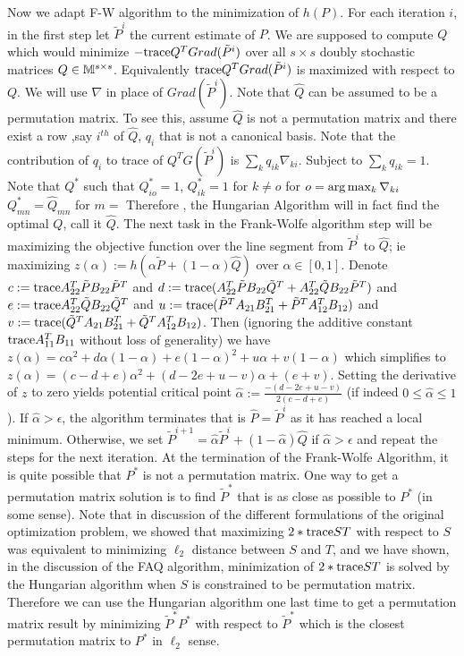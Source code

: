 \documentclass[12pt,oneside,final]{thesis}\usepackage[]{graphicx}\usepackage[]{color}
\begin{document}
Now we adapt F-W algorithm to the minimization of $h(P)$.  For each iteration $i$, in the first step let $\tilde{P}^{i}$ the current estimate of $P$. We are supposed to compute  $Q$ which would minimize  $-\textup{trace} Q^{T}Grad(\tilde{P}^{i})$ over all $s \times s$ doubly stochastic matrices $Q \in \mathbb{M} ^{s \times s}$. Equivalently $\textup{trace} Q^{T}Grad(\tilde{P}^{i})$ is maximized with respect to $Q$. We will use  $\nabla$ in place of $Grad(\tilde{P}^{i})$.
Note that $\hat{Q}$ can be assumed to be a permutation matrix.  To see this, assume $\hat{Q}$ is not a permutation matrix and there exist a row ,say $i^{th}$ of $\hat{Q}$, $q_i$ that is not a canonical basis. Note that the contribution of $q_{i}$ to trace of $Q^{T}G(\tilde{P}^{i})$ is $\sum_{k}{q_{ik}\nabla{}_{ki}}$. Subject to $\sum_{k}{q_{ik}}=1$. Note that $Q^{*}$ such that $Q_{io}^{*}=1$,  $Q_{ik}^{*}=1$ for $k \neq o$ for $o=\arg\max_k{\nabla{}_{ki}}$  $Q_{mn}^{*}=\hat{Q}_{mn}$ for $m=$
Therefore , the  Hungarian Algorithm will in fact find the optimal $Q$, call it
$\hat{Q}$.
The next task in the Frank-Wolfe algorithm step
will be maximizing the objective function over the line
segment from $\tilde{P}^{i}$ to $\hat{Q}$;  ie maximizing $z(\alpha):=h(\alpha \tilde{P}
+(1-\alpha ) \hat{Q})$ over $\alpha \in [0,1]$. Denote
$c:=\textup{trace} A^T_{22} \tilde{P} B_{22} \tilde{P}^T$ and
$d:=\textup{trace} (A^T_{22} \tilde{P} B_{22} \tilde{Q}^T +
    A^T_{22} \tilde{Q} B_{22} \tilde{P}^T)$ and
$e:=\textup{trace} A^T_{22} \tilde{Q} B_{22} \tilde{Q}^T$ and
$u:=\textup{trace} ( \tilde{P}^TA_{21}B_{21}^T   + \tilde{P}^TA_{12}^TB_{12} )$ and
$v:=\textup{trace} ( \tilde{Q}^TA_{21}B_{21}^T   + \tilde{Q}^TA_{12}^TB_{12} )$. Then
(ignoring the additive constant $\textup{trace} A_{11}^TB_{11}$ without loss of
generality)
we have $z(\alpha)=c \alpha^2+d \alpha (1-\alpha)
+e(1-\alpha)^2+u \alpha + v(1-\alpha)$  which simplifies to
$z(\alpha)=(c-d+e)\alpha^2+(d-2e+u-v)\alpha + (e+v)$. Setting the
derivative of $z$ to zero yields potential critical point
$\hat{\alpha}:=\frac{-(d-2e+u-v)}{2(c-d+e)}$ (if indeed
$0 \leq \hat{\alpha}\leq 1$). 
If $\hat{\alpha}>\epsilon$, the algorithm terminates that is $\hat{P}=\tilde{P}^{i}$ as it has reached a local minimum. Otherwise, we set $\tilde{P}^{i+1}= \hat{\alpha} \tilde{P}^{i}
+(1- \hat{\alpha} ) \hat{Q}$ if $\hat{\alpha}>\epsilon$   and repeat the steps for the next iteration.
At the termination of the Frank-Wolfe Algorithm, it is quite possible that   ${P}^{*}$ is not a permutation matrix. One way to get a permutation matrix solution is to find  ${\tilde{P}}^{*}$ that is as close as possible to  ${P}^{*}$ (in some sense).  Note that in discussion of the different formulations of the  original optimization problem, we showed that maximizing $2*\textup{trace} {ST}$ with respect to $S$ was equivalent to minimizing $\ell_2$ distance between $S$ and $T$, and we have shown, in the discussion of the FAQ algorithm, minimization of  $2*\textup{trace} {ST}$ is solved by the Hungarian algorithm when $S$ is constrained to be permutation matrix. Therefore we can use the Hungarian algorithm one last time to get a permutation matrix result by  minimizing ${\tilde{P}}^{*}{P}^{*}$ with respect to ${\tilde{P}}^{*}$  which is the closest permutation matrix to  ${{P}}^{*}$ in $\ell_2$ sense.
\end{document}
